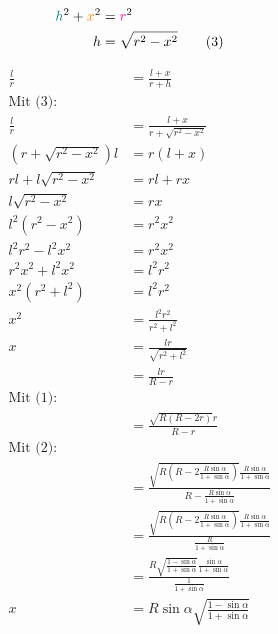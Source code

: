 \documentclass[12pt,a4paper,oneside]{article}
\begin{document}
\begin{align*}
	\textcolor{teal}{h}^2 + \textcolor{orange}{x}^2 &= \textcolor{magenta}{r}^2 \\
	h &= \sqrt{r^2-x^2} \tag{3}
\end{align*}

\begin{samepage}
	\begin{align*}
		\frac{l}{r} &= \frac{l+x}{r+h} \\
		\text{Mit (3):} \\
		\frac{l}{r} &= \frac{l+x}{r+\sqrt{r^2-x^2}} \\
		(r+\sqrt{r^2-x^2})l &= r(l+x) \\
		rl + l\sqrt{r^2-x^2} &= rl+rx \\
		l\sqrt{r^2-x^2} &= rx \\
		l^2(r^2-x^2) &= r^2 x^2 \\
		l^2 r^2 - l^2 x^2 &= r^2 x^2 \\
		r^2 x^2 + l^2 x^2 &= l^2 r^2 \\
		x^2 (r^2+l^2) &= l^2 r^2 \\
		x^2 &= \frac{l^2 r^2}{r^2 + l^2} \\
		x &= \frac{lr}{\sqrt{r^2+l^2}} \\
		&= \frac{lr}{R-r} \\
		\text{Mit (1):} \\
		&= \frac{\sqrt{R(R-2r)}r}{R-r} \\
		\text{Mit (2):} \\
		&= \frac{\sqrt{R(R-2\frac{R\sin\alpha}{1+\sin\alpha})}\frac{R\sin\alpha}{1+\sin\alpha}}{R-\frac{R\sin\alpha}{1+\sin\alpha}} \\
		&= \frac{\sqrt{R(R-2\frac{R\sin\alpha}{1+\sin\alpha})}\frac{R\sin\alpha}{1+\sin\alpha}}{\frac{R}{1+\sin\alpha}} \\
		&= \frac{R\sqrt{\frac{1-\sin\alpha}{1+\sin\alpha}}\frac{\sin\alpha}{1+\sin\alpha}}{\frac{1}{1+\sin\alpha}} \\
		x &= R\sin\alpha\sqrt{\frac{1-\sin\alpha}{1+\sin\alpha}} \tag{4}
	\end{align*}
\end{samepage}
\goodbreak
\end{document}
